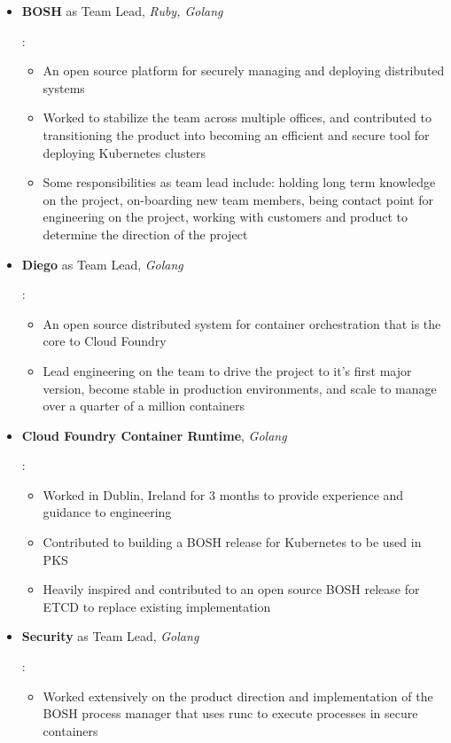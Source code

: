 \documentclass{resume}
\begin{document}
\begin{itemize}[leftmargin=*]
    \begin{itemize}
      \item \textbf{BOSH} as Team Lead, \textit{Ruby, Golang}{:
	\begin{itemize}
	  \item An open source platform for securely managing and deploying distributed systems
	  \item Worked to stabilize the team across multiple offices, and contributed to transitioning the product into becoming an efficient and secure tool for deploying Kubernetes clusters
	  \item Some responsibilities as team lead include: holding long term knowledge on the project, on-boarding new team members, being contact point for engineering on the project, working with customers and product to determine the direction of the project
	\end{itemize} \vspace{-2pt}}
      \item \textbf{Diego} as Team Lead, \textit{Golang}{:
	\begin{itemize}
	  \item An open source distributed system for container orchestration that is the core to Cloud Foundry
	  \item Lead engineering on the team to drive the project to it's first major version, become stable in production environments, and scale to manage over a quarter of a million containers
	\end{itemize} \vspace{-2pt}}
      \item \textbf{Cloud Foundry Container Runtime}, \textit{Golang}{:
	\begin{itemize}
	  \item Worked in Dublin, Ireland for 3 months to provide experience and guidance to engineering
	  \item Contributed to building a BOSH release for Kubernetes to be used in PKS
	  \item Heavily inspired and contributed to an open source BOSH release for ETCD to replace existing implementation
	\end{itemize} \vspace{-2pt}}
      \item \textbf{Security} as Team Lead, \textit{Golang}{:
	\begin{itemize}
	  \item Worked extensively on the product direction and implementation of the BOSH process manager that uses runc to execute processes in secure containers

\end{itemize}}
\end{itemize}
\end{itemize}
\end{document}
